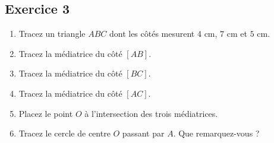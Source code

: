 \documentclass[12 pt]{extarticle}
\theoremstyle{plain}
\begin{document}
 
 \subsection*{Exercice 3}
 
 \begin{enumerate}
 \item Tracez un triangle $ABC$ dont les côtés mesurent $4$ cm, $7$ cm et $5$ cm. 
 \item Tracez la médiatrice du côté $[AB]$. 
 \item Tracez la médiatrice du côté $[BC]$. 
 \item Tracez la médiatrice du côté $[AC]$. 
 \item Placez le point $O$ à l'intersection des trois médiatrices. 
 \item Tracez le cercle de centre $O$ passant par $A$. Que remarquez-vous ? \end{enumerate}
 




 
 	
\end{document}

